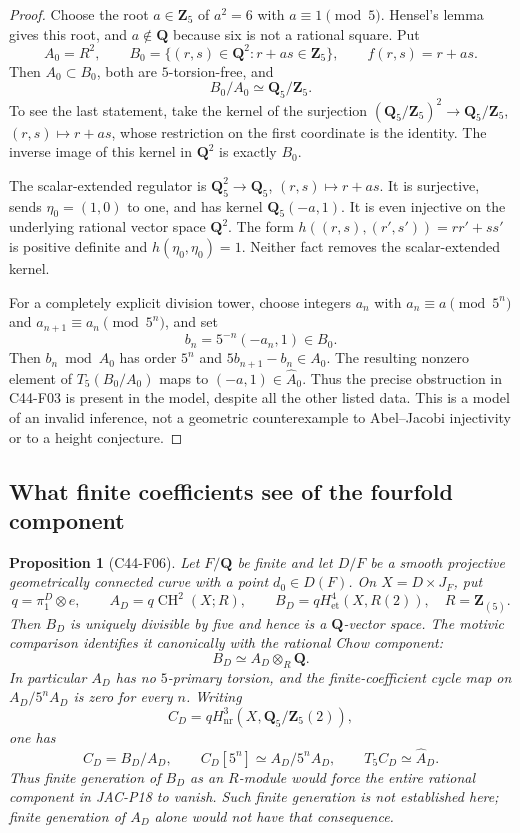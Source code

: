 \documentclass[11pt]{article}
\newtheorem{proposition}[theorem]{Proposition}
\theoremstyle{remark}\newtheorem{remark}[theorem]{Remark}
\begin{document}
\begin{proof}
Choose the root $a\in\mathbf Z_5$ of $a^2=6$ with $a\equiv1\pmod5$.
Hensel's lemma gives this root, and $a\notin\mathbf Q$ because
six is not a rational square.  Put
\[
 A_0=R^2,\qquad
 B_0=\{(r,s)\in\mathbf Q^2:r+as\in\mathbf Z_5\},
 \qquad f(r,s)=r+as.
\]
Then $A_0\subset B_0$, both are $5$-torsion-free, and
\[
  B_0/A_0\simeq\mathbf Q_5/\mathbf Z_5.
 \tag{F05.1}
\]
To see the last statement, take the kernel of the surjection
$(\mathbf Q_5/\mathbf Z_5)^2\to\mathbf Q_5/\mathbf Z_5$,
$(r,s)\mapsto r+as$, whose restriction on the first coordinate
is the identity.  The inverse image of this kernel in
$\mathbf Q^2$ is exactly $B_0$.

The scalar-extended regulator is
$\mathbf Q_5^2\to\mathbf Q_5$, $(r,s)\mapsto r+as$.
It is surjective, sends $\eta_0=(1,0)$ to one, and has kernel
$\mathbf Q_5(-a,1)$.  It is even injective on the underlying
rational vector space $\mathbf Q^2$.  The form
$h((r,s),(r',s'))=rr'+ss'$ is positive definite and
$h(\eta_0,\eta_0)=1$.  Neither fact removes the scalar-extended
kernel.

For a completely explicit division tower, choose integers $a_n$
with $a_n\equiv a\pmod{5^n}$ and
$a_{n+1}\equiv a_n\pmod{5^n}$, and set
\[
 b_n=5^{-n}(-a_n,1)\in B_0.
\]
Then $b_n\bmod A_0$ has order $5^n$ and
$5b_{n+1}-b_n\in A_0$.  The resulting nonzero element of
$T_5(B_0/A_0)$ maps to $(-a,1)\in\widehat A_0$.
Thus the precise obstruction in C44-F03 is present in the
model, despite all the other listed data.  This is a model of
an invalid inference, not a geometric counterexample to
Abel--Jacobi injectivity or to a height conjecture.
\end{proof}

\subsection{What finite coefficients see of the fourfold component}

\begin{proposition}[C44-F06]\label{C44-F06}
Let $F/\mathbf Q$ be finite and let $D/F$ be a smooth projective
geometrically connected curve with a point $d_0\in D(F)$.
On $X=D\times J_F$, put
\[
 q=\pi_1^D\otimes e,\qquad
 A_D=q\operatorname{CH}^2(X;R),\qquad
 B_D=qH^4_{\mathrm{et}}(X,R(2)),
 \quad R=\mathbf Z_{(5)}.
\]
Then $B_D$ is uniquely divisible by five and hence is a
$\mathbf Q$-vector space.  The motivic comparison identifies it
canonically with the rational Chow component:
\[
       B_D\simeq A_D\otimes_R\mathbf Q.
                                                        \tag{F06.1}
\]
In particular $A_D$ has no $5$-primary torsion, and the
finite-coefficient cycle map on $A_D/5^nA_D$ is zero for every $n$.
Writing
\[
 C_D=qH^3_{\mathrm{nr}}(X,\mathbf Q_5/\mathbf Z_5(2)),
\]
one has
\[
 C_D=B_D/A_D,\qquad
 C_D[5^n]\simeq A_D/5^nA_D,
 \qquad T_5C_D\simeq\widehat A_D.             \tag{F06.2}
\]
Thus finite generation of $B_D$ as an $R$-module would force
the entire rational component in JAC-P18 to vanish.  Such finite
generation is not established here; finite generation of $A_D$
alone would not have that consequence.
\end{proposition}
\end{document}
